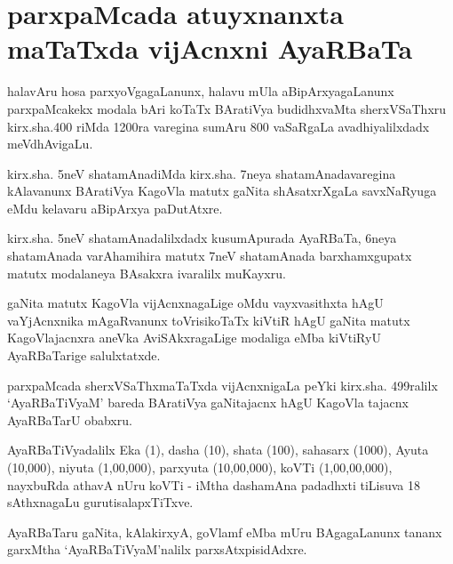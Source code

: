 \chapter{parxpaMcada atuyxnanxta maTaTxda vijAcnxni AyaRBaTa}%

halavAru hosa parxyoVgagaLanunx, halavu mUla aBipArxyagaLanunx parxpaMcakekx modala bAri koTaTx BAratiVya budidhxvaMta sherxVSaThxru kirx.sha.{\rm 400} riMda {\rm 1200}ra varegina sumAru {\rm 800} vaSaRgaLa avadhiyalilxdadx meVdhAvigaLu.

kirx.sha. {\rm 5}neV shatamAnadiMda kirx.sha. {\rm 7}neya shatamAnadavaregina kAlavanunx BAratiVya KagoVla matutx gaNita shAsatxrXgaLa savxNaRyuga eMdu kelavaru aBipArxya paDutAtxre.

kirx.sha. {\rm 5}neV shatamAnadalilxdadx kusumApurada AyaRBaTa, {\rm 6}neya shatamAnada varAhamihira matutx {\rm 7}neV shatamAnada barxhamxgupatx matutx modalaneya BAsakxra ivaralilx muKayxru.

gaNita matutx KagoVla vijAcnxnagaLige oMdu vayxvasithxta hAgU vaYjAcnxnika mAgaRvanunx toVrisikoTaTx kiVtiR hAgU gaNita matutx KagoVlajacnxra aneVka AviSAkxragaLige modaliga eMba kiVtiRyU AyaRBaTarige salulxtatxde.

parxpaMcada sherxVSaThxmaTaTxda vijAcnxnigaLa peYki kirx.sha. {\rm 499}ralilx `AyaRBaTiVyaM' bareda BAratiVya gaNitajacnx hAgU KagoVla tajacnx AyaRBaTarU obabxru.

AyaRBaTiVyadalilx Eka ({\rm 1}), dasha ({\rm 10}), shata ({\rm 100}), sahasarx ({\rm 1000}), Ayuta ({\rm 10,000}), niyuta ({\rm 1,00,000}), parxyuta ({\rm 10,00,000}), koVTi ({\rm 1,00,00,000}), nayxbuRda athavA nUru koVTi - iMtha dashamAna padadhxti tiLisuva {\rm 18} sAthxnagaLu gurutisalapxTiTxve.

AyaRBaTaru gaNita, kAlakirxyA, goVlamf eMba mUru BAgagaLanunx tananx garxMtha `AyaRBaTiVyaM'nalilx parxsAtxpisidAdxre.

